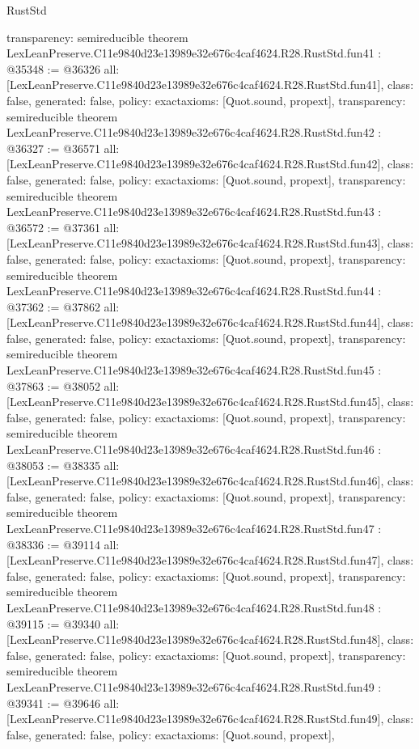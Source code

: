 \begin{lexlean}{RustStd}
\begin{coremodule}
{  transparency: semireducible
}
theorem LexLeanPreserve.C11e9840d23e13989e32e676c4caf4624.R28.RustStd.fun41 : @35348 := @36326 {
  all: [LexLeanPreserve.C11e9840d23e13989e32e676c4caf4624.R28.RustStd.fun41],
  class: false,
  generated: false,
  policy: exact{axioms: [Quot.sound, propext]},
  transparency: semireducible
}
theorem LexLeanPreserve.C11e9840d23e13989e32e676c4caf4624.R28.RustStd.fun42 : @36327 := @36571 {
  all: [LexLeanPreserve.C11e9840d23e13989e32e676c4caf4624.R28.RustStd.fun42],
  class: false,
  generated: false,
  policy: exact{axioms: [Quot.sound, propext]},
  transparency: semireducible
}
theorem LexLeanPreserve.C11e9840d23e13989e32e676c4caf4624.R28.RustStd.fun43 : @36572 := @37361 {
  all: [LexLeanPreserve.C11e9840d23e13989e32e676c4caf4624.R28.RustStd.fun43],
  class: false,
  generated: false,
  policy: exact{axioms: [Quot.sound, propext]},
  transparency: semireducible
}
theorem LexLeanPreserve.C11e9840d23e13989e32e676c4caf4624.R28.RustStd.fun44 : @37362 := @37862 {
  all: [LexLeanPreserve.C11e9840d23e13989e32e676c4caf4624.R28.RustStd.fun44],
  class: false,
  generated: false,
  policy: exact{axioms: [Quot.sound, propext]},
  transparency: semireducible
}
theorem LexLeanPreserve.C11e9840d23e13989e32e676c4caf4624.R28.RustStd.fun45 : @37863 := @38052 {
  all: [LexLeanPreserve.C11e9840d23e13989e32e676c4caf4624.R28.RustStd.fun45],
  class: false,
  generated: false,
  policy: exact{axioms: [Quot.sound, propext]},
  transparency: semireducible
}
theorem LexLeanPreserve.C11e9840d23e13989e32e676c4caf4624.R28.RustStd.fun46 : @38053 := @38335 {
  all: [LexLeanPreserve.C11e9840d23e13989e32e676c4caf4624.R28.RustStd.fun46],
  class: false,
  generated: false,
  policy: exact{axioms: [Quot.sound, propext]},
  transparency: semireducible
}
theorem LexLeanPreserve.C11e9840d23e13989e32e676c4caf4624.R28.RustStd.fun47 : @38336 := @39114 {
  all: [LexLeanPreserve.C11e9840d23e13989e32e676c4caf4624.R28.RustStd.fun47],
  class: false,
  generated: false,
  policy: exact{axioms: [Quot.sound, propext]},
  transparency: semireducible
}
theorem LexLeanPreserve.C11e9840d23e13989e32e676c4caf4624.R28.RustStd.fun48 : @39115 := @39340 {
  all: [LexLeanPreserve.C11e9840d23e13989e32e676c4caf4624.R28.RustStd.fun48],
  class: false,
  generated: false,
  policy: exact{axioms: [Quot.sound, propext]},
  transparency: semireducible
}
theorem LexLeanPreserve.C11e9840d23e13989e32e676c4caf4624.R28.RustStd.fun49 : @39341 := @39646 {
  all: [LexLeanPreserve.C11e9840d23e13989e32e676c4caf4624.R28.RustStd.fun49],
  class: false,
  generated: false,
  policy: exact{axioms: [Quot.sound, propext]},
}
\end{coremodule}
\end{lexlean}
